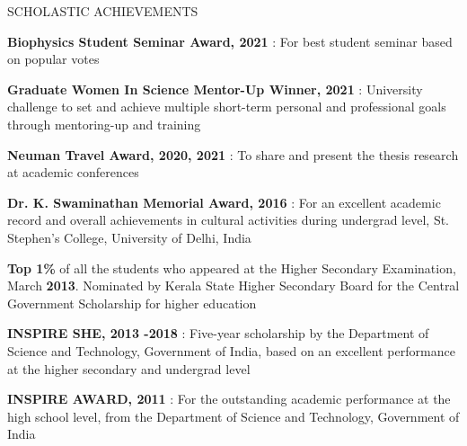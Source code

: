 \documentclass{resume} %
\begin{document}
\begin{rSection}{SCHOLASTIC ACHIEVEMENTS}
   \vspace{-1.25em}
   \item \textbf{Biophysics Student Seminar Award, 2021} : For best student seminar based on popular votes
   \item \textbf{Graduate Women In Science Mentor-Up Winner, 2021} : University challenge to set and achieve multiple short-term personal and professional goals through mentoring-up and training
   \item \textbf{Neuman Travel Award, 2020, 2021} : To share and present the thesis research at academic conferences
   \item \textbf{Dr. K. Swaminathan Memorial Award, 2016} : For an excellent academic record and overall achievements in cultural activities during undergrad level, St. Stephen's College, University of Delhi, India
   \item \textbf{Top 1\%} of all the students who appeared at the Higher Secondary Examination, March \textbf{2013}. Nominated by Kerala State Higher Secondary Board for the Central Government Scholarship for higher education
   \item \textbf{INSPIRE SHE, 2013 -2018} : Five-year scholarship by the Department of Science and Technology, Government of India, based on an excellent performance at the higher secondary and undergrad level
   \item \textbf{INSPIRE AWARD, 2011} : For the outstanding academic performance at the high school level, from the Department of Science and Technology, Government of India


\end{rSection}
\end{document}
